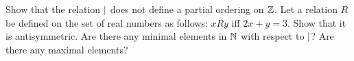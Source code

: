 \begin{chapterendexercises}
  \exercise[recommended] Show that the relation $\mid$ does not define a partial
    ordering on $\mathbb{Z}$.
  \exercise Let a relation $R$ be defined on the set of real numbers as
    follows: $x R y$ iff $2x + y = 3$. Show that it is antisymmetric.
  \exercise Are there any minimal elements in $\mathbb{N}$ with respect to
    $\mid$? Are there any maximal elements?
\end{chapterendexercises}
